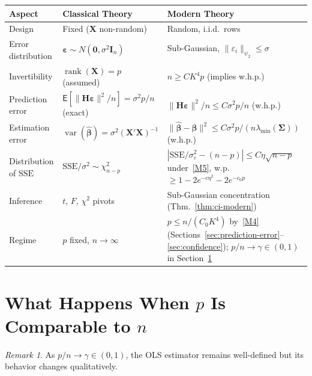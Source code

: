 \documentclass[14pt]{extarticle}
\theoremstyle{plain}
\theoremstyle{definition}
\theoremstyle{remark}
\newtheorem*{remark}{Remark}
\newcommand\expc{\mathsf{E}}
\DeclareMathOperator\var{var}
\DeclareMathOperator\rank{rank}
\newcommand{\SSE}{\mathrm{SSE}}
\newcommand{\bX}{\mathbf{X}}
\def\bb{\boldsymbol{\beta}}
\newcommand{\be}{\boldsymbol{\varepsilon}}
\newcommand{\bI}{\mathbf{I}}
\newcommand{\bH}{\mathbf{H}}
\newcommand{\bzero}{\mathbf{0}}
\newcommand{\bSigma}{\boldsymbol{\Sigma}}
\newcommand{\hbb}{\hat{\boldsymbol{\beta}}}
\begin{document}
\medskip
\begin{center}
\renewcommand{\arraystretch}{1.4}
\begin{tabular}{@{}>{\raggedright\arraybackslash}p{4cm}>{\raggedright\arraybackslash}p{8.5cm}>{\raggedright\arraybackslash}p{11cm}@{}}
\toprule
\textbf{Aspect} & \textbf{Classical Theory} & \textbf{Modern Theory} \\
\midrule
Design & Fixed ($\bX$ non-random) & Random, i.i.d.\ rows \\
Error distribution & $\be \sim N(\bzero, \sigma^2\bI_n)$ & Sub-Gaussian, $\|\varepsilon_i\|_{\psi_2} \leqslant \sigma$ \\
Invertibility & $\rank(\bX) = p$ (assumed) & $n \geqslant CK^4 p$ (implies w.h.p.) \\
Prediction error & $\expc[\|\bH\be\|^2/n] = \sigma^2 p/n$ (exact) & $\|\bH\be\|^2/n \leqslant C\sigma^2 p/n$ (w.h.p.) \\
Estimation error & $\var(\hat{\bb}) = \sigma^2(\bX'\bX)^{-1}$ & $\|\hbb - \bb\|^2 \leqslant C\sigma^2 p/(n\lambda_{\min}(\bSigma))$ (w.h.p.) \\
Distribution of $\SSE$ & $\SSE/\sigma^2 \sim \chi^2_{n-p}$ & $|\SSE/\sigma_\varepsilon^2 - (n-p)| \leqslant C\eta\sqrt{n-p}$ under~\ref{M5}, w.p.\ $\geqslant 1 - 2e^{-c\eta^2} - 2e^{-c_0p}$ \\
Inference & $t$, $F$, $\chi^2$ pivots & Sub-Gaussian concentration (Thm.~\ref{thm:ci-modern}) \\
Regime & $p$ fixed, $n \to \infty$ & $p \leqslant n/(C_0K^4)$ by~\ref{M4} (Sections~\ref{sec:prediction-error}--\ref{sec:confidence}); $p/n \to \gamma \in (0,1)$ in Section~\ref{sec:p-comparable-n} \\
\bottomrule
\end{tabular}
\end{center}

\section{What Happens When $p$ Is Comparable to $n$}\label{sec:p-comparable-n}

\begin{remark}
As $p/n \to \gamma \in (0,1)$, the OLS estimator remains well-defined but its behavior changes qualitatively.
\end{remark}
\end{document}
